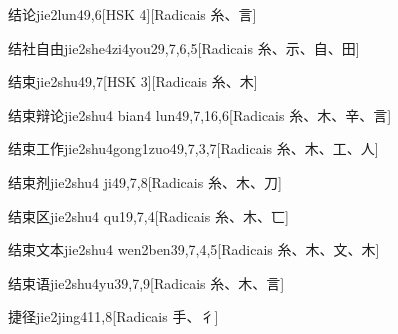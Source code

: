 \begin{entry}{结论}{jie2lun4}{9,6}[HSK 4][Radicais ⽷、⾔]
\end{entry}

\begin{entry}{结社自由}{jie2she4zi4you2}{9,7,6,5}[Radicais ⽷、⽰、⾃、⽥]
\end{entry}

\begin{entry}{结束}{jie2shu4}{9,7}[HSK 3][Radicais ⽷、⽊]
\end{entry}

\begin{entry}{结束辩论}{jie2shu4 bian4 lun4}{9,7,16,6}[Radicais ⽷、⽊、⾟、⾔]
\end{entry}

\begin{entry}{结束工作}{jie2shu4gong1zuo4}{9,7,3,7}[Radicais ⽷、⽊、⼯、⼈]
\end{entry}

\begin{entry}{结束剂}{jie2shu4 ji4}{9,7,8}[Radicais ⽷、⽊、⼑]
\end{entry}

\begin{entry}{结束区}{jie2shu4 qu1}{9,7,4}[Radicais ⽷、⽊、⼖]
\end{entry}

\begin{entry}{结束文本}{jie2shu4 wen2ben3}{9,7,4,5}[Radicais ⽷、⽊、⽂、⽊]
\end{entry}

\begin{entry}{结束语}{jie2shu4yu3}{9,7,9}[Radicais ⽷、⽊、⾔]
\end{entry}

\begin{entry}{捷径}{jie2jing4}{11,8}[Radicais ⼿、⼻]
\end{entry}

